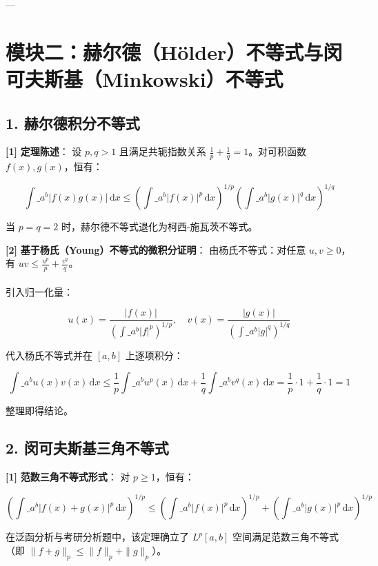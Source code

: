 \documentclass[11pt,a4paper,UTF8]{ctexart}
\begin{document}
---


\section{模块二：赫尔德（Hölder）不等式与闵可夫斯基（Minkowski）不等式}


\subsection{1. 赫尔德积分不等式}
\begin{solbox}[分步推导与答题规范]
\textbf{[1]}  \textbf{定理陈述}：
设 $p, q > 1$ 且满足共轭指数关系 $\frac{1}{p} + \frac{1}{q} = 1$。对可积函数 $f(x), g(x)$，恒有：

\begin{equation*}
\int\_a^b |f(x)g(x)|\,\mathrm{d}x \le \left( \int\_a^b |f(x)|^p\,\mathrm{d}x \right)^{1/p} \left( \int\_a^b |g(x)|^q\,\mathrm{d}x \right)^{1/q}
\end{equation*}

当 $p = q = 2$ 时，赫尔德不等式退化为柯西-施瓦茨不等式。

\textbf{[2]}  \textbf{基于杨氏（Young）不等式的微积分证明}：
由杨氏不等式：对任意 $u, v \ge 0$，有 $u v \le \frac{u^p}{p} + \frac{v^q}{q}$。\\ \\
引入归一化量：

\begin{equation*}
u(x) = \frac{|f(x)|}{\left( \int\_a^b |f|^p \right)^{1/p}},\quad v(x) = \frac{|g(x)|}{\left( \int\_a^b |g|^q \right)^{1/q}}
\end{equation*}

代入杨氏不等式并在 $[a, b]$ 上逐项积分：

\begin{equation*}
\int\_a^b u(x)v(x)\,\mathrm{d}x \le \frac{1}{p}\int\_a^b u^p(x)\,\mathrm{d}x + \frac{1}{q}\int\_a^b v^q(x)\,\mathrm{d}x = \frac{1}{p} \cdot 1 + \frac{1}{q} \cdot 1 = 1
\end{equation*}

整理即得结论。
\end{solbox}


\subsection{2. 闵可夫斯基三角不等式}
\begin{solbox}[分步推导与答题规范]
\textbf{[1]}  \textbf{范数三角不等式形式}：
对 $p \ge 1$，恒有：

\begin{equation*}
\left( \int\_a^b |f(x) + g(x)|^p\,\mathrm{d}x \right)^{1/p} \le \left( \int\_a^b |f(x)|^p\,\mathrm{d}x \right)^{1/p} + \left( \int\_a^b |g(x)|^p\,\mathrm{d}x \right)^{1/p}
\end{equation*}

在泛函分析与考研分析题中，该定理确立了 $L^p[a, b]$ 空间满足范数三角不等式（即 $\|f+g\|_p \le \|f\|_p + \|g\|_p$）。
\end{solbox}
\end{document}
